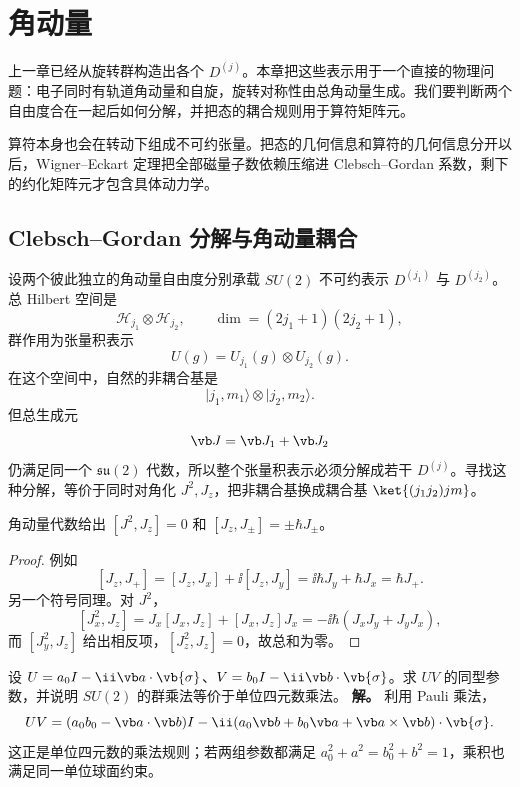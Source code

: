 \chapter{角动量}
\label{chap:angular-momentum}

上一章已经从旋转群构造出各个 $D^{(j)}$。本章把这些表示用于一个直接的物理问题：电子同时有轨道角动量和自旋，旋转对称性由总角动量生成。我们要判断两个自由度合在一起后如何分解，并把态的耦合规则用于算符矩阵元。

算符本身也会在转动下组成不可约张量。把态的几何信息和算符的几何信息分开以后，Wigner--Eckart 定理把全部磁量子数依赖压缩进 Clebsch--Gordan 系数，剩下的约化矩阵元才包含具体动力学。

\section{Clebsch--Gordan 分解与角动量耦合}
\label{sec:cg-coupling}

设两个彼此独立的角动量自由度分别承载 $SU(2)$ 不可约表示 $D^{(j_1)}$ 与 $D^{(j_2)}$。总 Hilbert 空间是
\[
\mathcal H_{j_1}\otimes\mathcal H_{j_2},
\qquad
\dim=(2j_1+1)(2j_2+1),
\]
群作用为张量积表示
\[
U(g)=U_{j_1}(g)\otimes U_{j_2}(g).
\]
在这个空间中，自然的非耦合基是
\[
\lvert j_1,m_1\rangle\otimes\lvert j_2,m_2\rangle.
\]
但总生成元
\[
\vb J=\vb J_1+\vb J_2
\]
仍满足同一个 $\mathfrak{su}(2)$ 代数，所以整个张量积表示必须分解成若干 $D^{(j)}$。寻找这种分解，等价于同时对角化 $J^2,J_z$，把非耦合基换成耦合基 $\ket{(j_1j_2)jm}$。

\begin{proposition}
角动量代数给出 $[J^2,J_z]=0$ 和 $[J_z,J_\pm]=\pm\hbar J_\pm$。
\end{proposition}

\begin{proof}
例如
\[
[J_z,J_+]=[J_z,J_x]+\ii[J_z,J_y]
=\ii\hbar J_y+\hbar J_x=\hbar J_+.
\]
另一个符号同理。对 $J^2$，
\[
[J_x^2,J_z]=J_x[J_x,J_z]+[J_x,J_z]J_x
=-\ii\hbar(J_xJ_y+J_yJ_x),
\]
而 $[J_y^2,J_z]$ 给出相反项，$[J_z^2,J_z]=0$，故总和为零。
\end{proof}


\begin{workedexample}
设 $U=a_0I-\ii\vb a\cdot\vb{\sigma}$、$V=b_0I-\ii\vb b\cdot\vb{\sigma}$。求 $UV$ 的同型参数，并说明 $SU(2)$ 的群乘法等价于单位四元数乘法。
\textbf{解。} 利用 Pauli 乘法，
\[
UV=(a_0b_0-\vb a\cdot\vb b)I
-\ii(a_0\vb b+b_0\vb a+\vb a\times\vb b)\cdot\vb{\sigma}.
\]
这正是单位四元数的乘法规则；若两组参数都满足 $a_0^2+a^2=b_0^2+b^2=1$，乘积也满足同一单位球面约束。
\end{workedexample}


